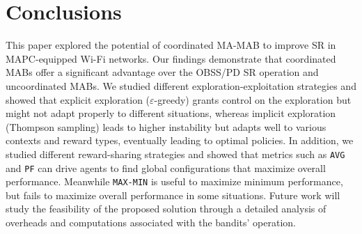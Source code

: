 \section{Conclusions}
\label{sec:conclusions}

This paper explored the potential of coordinated MA-MAB to improve SR in MAPC-equipped Wi-Fi networks. Our findings demonstrate that coordinated MABs offer a significant advantage over the OBSS/PD SR operation and uncoordinated MABs. We studied different exploration-exploitation strategies and showed that explicit exploration ($\varepsilon$-greedy) grants control on the exploration but might not adapt properly to different situations, whereas implicit exploration (Thompson sampling) leads to higher instability but adapts well to various contexts and reward types, eventually leading to optimal policies. In addition, we studied different reward-sharing strategies and showed that metrics such as \texttt{AVG} and \texttt{PF} can drive agents to find global configurations that maximize overall performance. Meanwhile \texttt{MAX-MIN} is useful to maximize minimum performance, but fails to maximize overall performance in some situations. Future work will study the feasibility of the proposed solution through a detailed analysis of overheads and computations associated with the bandits' operation. 